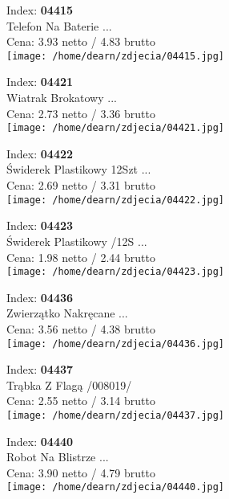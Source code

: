 {Index: \textbf{04415}\\
Telefon Na Baterie        ...\\
Cena: 3.93 netto / 4.83 brutto\\
  \texttt{[image: /home/dearn/zdjecia/04415.jpg]}}\newline\newline

{Index: \textbf{04421}\\
Wiatrak Brokatowy         ...\\
Cena: 2.73 netto / 3.36 brutto\\
  \texttt{[image: /home/dearn/zdjecia/04421.jpg]}}\newline\newline

{Index: \textbf{04422}\\
Świderek Plastikowy 12Szt ...\\
Cena: 2.69 netto / 3.31 brutto\\
  \texttt{[image: /home/dearn/zdjecia/04422.jpg]}}\newline\newline

{Index: \textbf{04423}\\
Świderek Plastikowy  /12S ...\\
Cena: 1.98 netto / 2.44 brutto\\
  \texttt{[image: /home/dearn/zdjecia/04423.jpg]}}\newline\newline

{Index: \textbf{04436}\\
Zwierzątko Nakręcane      ...\\
Cena: 3.56 netto / 4.38 brutto\\
  \texttt{[image: /home/dearn/zdjecia/04436.jpg]}}\newline\newline

{Index: \textbf{04437}\\
Trąbka Z Flagą /008019/\\
Cena: 2.55 netto / 3.14 brutto\\
  \texttt{[image: /home/dearn/zdjecia/04437.jpg]}}\newline\newline

{Index: \textbf{04440}\\
Robot Na Blistrze         ...\\
Cena: 3.90 netto / 4.79 brutto\\
  \texttt{[image: /home/dearn/zdjecia/04440.jpg]}}\newline\newline

